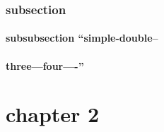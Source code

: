 \documentclass{book}
\begin{document}
\subsection{{subsection}}
\label{anchor:subsection}%


\label{anchor:anchor}%

\subsubsection{{subsubsection ``simple-double--}}
\label{anchor:subsubsection-_0060_0060simple_002ddouble_002d_002d}%

\subsubsection{{three---four----''}}
\label{anchor:subsubsection-three_002d_002d_002dfour_002d_002d_002d_002d_0027_0027}%

\chapter*{{\centering chapter 2}}
\label{anchor:chapter2}%

\printindex[cp]
\printindex[fn]
\end{document}
